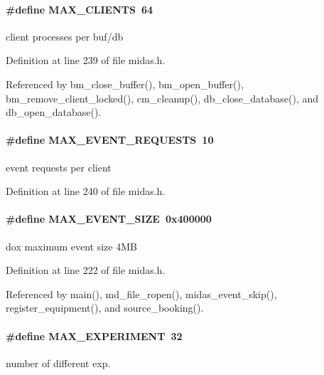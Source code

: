 \paragraph[{MAX\_\-CLIENTS}]{\setlength{\rightskip}{0pt plus 5cm}\#define MAX\_\-CLIENTS~64}\hfill\label{group__midasincludecode_ga0a8f91f93d75a07f0ae45077db45b3eb}
client processes per buf/db 

Definition at line 239 of file midas.h.

Referenced by bm\_\-close\_\-buffer(), bm\_\-open\_\-buffer(), bm\_\-remove\_\-client\_\-locked(), cm\_\-cleanup(), db\_\-close\_\-database(), and db\_\-open\_\-database().
\paragraph[{MAX\_\-EVENT\_\-REQUESTS}]{\setlength{\rightskip}{0pt plus 5cm}\#define MAX\_\-EVENT\_\-REQUESTS~10}\hfill\label{group__midasincludecode_gabe76a0bd645baa376f4443c59d16e36a}
event requests per client 

Definition at line 240 of file midas.h.
\paragraph[{MAX\_\-EVENT\_\-SIZE}]{\setlength{\rightskip}{0pt plus 5cm}\#define MAX\_\-EVENT\_\-SIZE~0x400000}\hfill\label{group__midasincludecode_ga05d5acc365e3342523d84bc4540adc09}
dox maximum event size 4MB 

Definition at line 222 of file midas.h.

Referenced by main(), md\_\-file\_\-ropen(), midas\_\-event\_\-skip(), register\_\-equipment(), and source\_\-booking().
\paragraph[{MAX\_\-EXPERIMENT}]{\setlength{\rightskip}{0pt plus 5cm}\#define MAX\_\-EXPERIMENT~32}\hfill\label{group__midasincludecode_ga96dcd778f7870d9d3a834f63f7e8506e}
number of different exp. 

